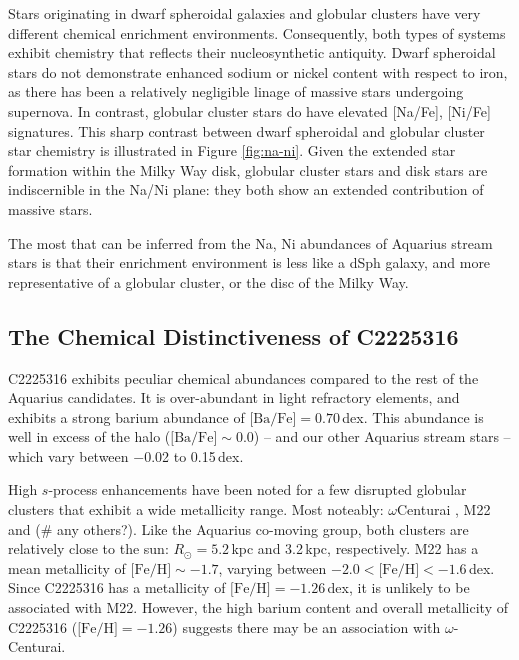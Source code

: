 \documentclass{emulateapj}
\begin{document}
Stars originating in dwarf spheroidal galaxies and globular clusters have very different chemical enrichment environments. Consequently, both types of systems exhibit chemistry that reflects their nucleosynthetic antiquity. Dwarf spheroidal stars do not demonstrate enhanced sodium or nickel content with respect to iron, as there has been a relatively negligible linage of massive stars undergoing supernova. In contrast, globular cluster stars do have elevated [Na/Fe], [Ni/Fe] signatures. This sharp contrast between dwarf spheroidal and globular cluster star chemistry is illustrated in Figure \ref{fig:na-ni}. Given the extended star formation within the Milky Way disk, globular cluster stars and disk stars are indiscernible in the Na/Ni plane: they both show an extended contribution of massive stars. 

The most that can be inferred from the Na, Ni abundances of Aquarius stream stars is that their enrichment environment is less like a dSph galaxy, and more representative of a globular cluster, or the disc of the Milky Way. 



\subsection{The Chemical Distinctiveness of C2225316}


C2225316 exhibits peculiar chemical abundances compared to the rest of the Aquarius candidates. It is over-abundant in light refractory elements, and exhibits a strong barium abundance of $\mbox{[Ba/Fe]} = 0.70$\,dex. This abundance is well in excess of the halo ($\mbox{[Ba/Fe]} \sim 0.0$) \--- and our other Aquarius stream stars \--- which vary between $-$0.02 to 0.15\,dex.

High $s$-process enhancements have been noted for a few disrupted globular clusters that exhibit a wide metallicity range. Most noteably: $\omega$Centurai \citep{majewski;et-al_2012}, M22 \citep{marino;et-al_2011} and (\# any others?). Like the Aquarius co-moving group, both clusters are relatively close to the sun: $R_\odot = 5.2$\,kpc and 3.2\,kpc, respectively. M22 has a mean metallicity of $\mbox{[Fe/H]} \sim -1.7$, varying between $-2.0 < \mbox{[Fe/H]} < -1.6$\,dex. Since C2225316 has a metallicity of $\mbox{[Fe/H]} = -1.26$\,dex, it is unlikely to be associated with M22. However, the high barium content and overall metallicity of C2225316 ($\mbox{[Fe/H]} = -1.26$) suggests there may be an association with $\omega$-Centurai.
\end{document}
